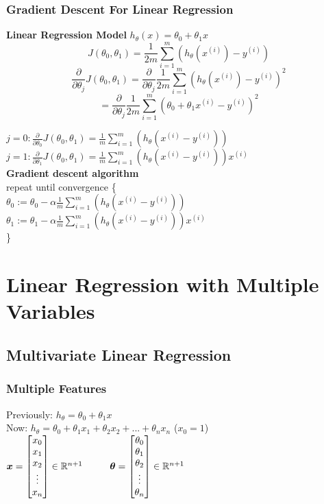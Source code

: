 \documentclass{article}
\newcommand\tab[1][1cm]{\hspace*{#1}}
\newcommand{\vect}[1]{\boldsymbol{#1}}
\begin{document}
\subsubsection{Gradient Descent For Linear Regression}
\textbf{Linear Regression Model}
$h_\theta(x) = \theta_0 + \theta_1 x$
$$J(\theta_0, \theta_1) = \frac{1}{2m} \sum_{i=1}^{m}(h_\theta(x^{(i)}) - y^{(i)})$$
$$\frac{\partial}{\partial \theta_j}J(\theta_0, \theta_1) = \frac{\partial}{\partial \theta_j} \frac{1}{2m} \sum_{i=1}^{m}(h_\theta(x^{(i)}) - y^{(i)})^2$$
$$ = \frac{\partial}{\partial \theta_j} \frac{1}{2m} \sum_{i=1}^{m}(\theta_0 + \theta_1 x^{(i)} - y^{(i)})^2$$

$j = 0: \frac{\partial}{\partial \theta_0}J(\theta_0, \theta_1) = \frac{1}{m} \sum_{i=1}^{m}(h_\theta(x^{(i)} - y^{(i)}))$\\
$j = 1: \frac{\partial}{\partial \theta_1}J(\theta_0, \theta_1) = \frac{1}{m} \sum_{i=1}^{m}(h_\theta(x^{(i)} - y^{(i)})) x^{(i)}$\\

\textbf{Gradient descent algorithm}\\
repeat until convergence \{\\
\tab $\theta_0 := \theta_0 - \alpha \frac{1}{m} \sum_{i=1}^{m}(h_\theta(x^{(i)} - y^{(i)})) $ \\
\tab $\theta_1 := \theta_1 - \alpha \frac{1}{m} \sum_{i=1}^{m}(h_\theta(x^{(i)} - y^{(i)})) x^{(i)} $ \\
\}\\

\newpage

\section{Linear Regression with Multiple Variables}
\subsection{Multivariate Linear Regression}
\subsubsection{Multiple Features}
Previously: $h_\theta = \theta_0 + \theta_1 x$ \\
Now: $h_\theta = \theta_0 + \theta_1 x_1 + \theta_2 x_2 + ... + \theta_n x_n$ ($x_0 = 1$) \\

$\vect{x} = \begin{bmatrix}
x_0 \\ x_1 \\ x_2 \\ \vdots \\ x_n 
\end{bmatrix} \in \mathbb{R}^{n+1}
\tab
\vect{\theta} = \begin{bmatrix}
\theta_0 \\ \theta_1 \\ \theta_2 \\ \vdots \\ \theta_n 
\end{bmatrix} \in \mathbb{R}^{n+1} \\\\
\tab$
\end{document}
